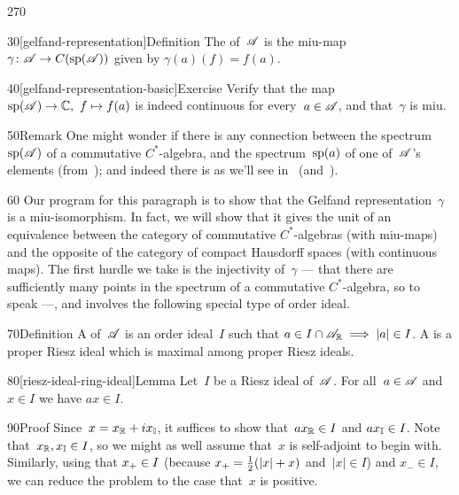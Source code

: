 \begin{parsec}{270}
\begin{point}{30}[gelfand-representation]{Definition}
The 
of~$\mathscr{A}$
is the miu-map~$\gamma\colon \mathscr{A}\to C(\mathrm{sp}(\mathscr{A}))$%
given by $\gamma(a)(f)=f(a)$.
\end{point}
\begin{point}{40}[gelfand-representation-basic]{Exercise}%
Verify that 
 the map $\spec(\scrA)\to \C,\ f\mapsto f(a)$ is indeed
continuous for every~$a\in\mathscr{A}$,
and that~$\gamma$ is miu.
\end{point}
\begin{point}{50}{Remark}
One might wonder if there is any connection between
the spectrum~$\mathrm{sp}(\mathscr{A})$
of a commutative $C^*$-algebra,
and the spectrum~$\mathrm{sp}(a)$
of one of~$\mathscr{A}$'s elements (from~);
and indeed there is
as we'll see in~
(and~).
\end{point}
\begin{point}{60}%
Our program for this paragraph is to show that
the Gelfand representation~$\gamma$ is 
a miu-isomorphism.
In fact,
we will show that it gives the unit
of an equivalence between the category of commutative $C^*$-algebras
(with miu-maps)
and the opposite of the category of compact Hausdorff spaces
(with continuous maps).
The first hurdle we take is the injectivity of~$\gamma$
--- that there are sufficiently many
points in the spectrum of a commutative $C^*$-algebra,
so to speak ---,
and involves
the following special type of order ideal.
\end{point}
\begin{point}{70}{Definition}%
A %
of~$\mathscr{A}$
is an order ideal~$I$
such that $a\in I\cap\mathscr{A}_{\mathbb{R}}\implies \left|a\right|\in I$.
A %
is a proper Riesz ideal which is maximal among
proper Riesz ideals.
\end{point}
\begin{point}{80}[riesz-ideal-ring-ideal]{Lemma}%
Let~$I$ be a Riesz ideal of~$\mathscr{A}$.
For all~$a\in \mathscr{A}$ and $x\in I$ we have $ax\in I$.
\begin{point}{90}{Proof}%
Since~$x=x_{\mathbb{R}}+ix_{\mathbb{I}}$,
it suffices to show that~$ax_{\mathbb{R}}\in I$ and $ax_{\mathbb{I}}\in I$.
Note that~$x_{\mathbb{R}},x_{\mathbb{I}}\in I$,
so we might as well assume that~$x$ is self-adjoint to begin with.
Similarly, using that
 $x_{+}\in I$ (because $x_{+}=\frac{1}{2}(\left|x\right|+x)$
and~$\left|x\right|\in I$) and $x_-\in I$,
we can reduce the problem to the case that~$x$ is positive.

\end{point}
\end{point}
\end{parsec}
